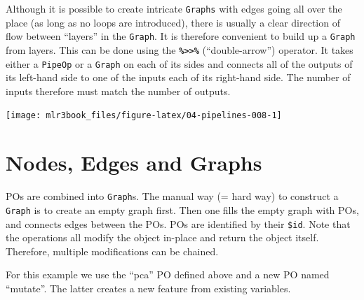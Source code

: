 \documentclass[
  11pt,
  parskip=half,
  DIV=calc,
  BCOR=10mm,
  x11names]{scrbook}
\newenvironment{Shaded}{}{}
\newcommand{\CommentTok}[1]{\textcolor[rgb]{0.00,0.50,0.00}{#1}}
\newcommand{\DataTypeTok}[1]{#1}
\newcommand{\KeywordTok}[1]{\textcolor[rgb]{0.00,0.00,1.00}{#1}}
\newcommand{\NormalTok}[1]{#1}
\newcommand{\OperatorTok}[1]{#1}
\newcommand{\OtherTok}[1]{\textcolor[rgb]{1.00,0.25,0.00}{#1}}
\newcommand{\StringTok}[1]{\textcolor[rgb]{0.00,0.50,0.50}{#1}}
\begin{document}
Although it is possible to create intricate \texttt{Graphs} with edges going all over the place (as long as no loops are introduced), there is usually a clear direction of flow between ``layers'' in the \texttt{Graph}.
It is therefore convenient to build up a \texttt{Graph} from layers.
This can be done using the \textbf{\texttt{\%\textgreater{}\textgreater{}\%}} (``double-arrow'') operator.
It takes either a \texttt{PipeOp} or a \texttt{Graph} on each of its sides and connects all of the outputs of its left-hand side to one of the inputs each of its right-hand side.
The number of inputs therefore must match the number of outputs.

\begin{Shaded}
\end{Shaded}

\begin{center}\texttt{[image: mlr3book\_files/figure-latex/04-pipelines-008-1]} \end{center}

\hypertarget{pipe-nodes-edges-graphs}{%
\section{Nodes, Edges and Graphs}\label{pipe-nodes-edges-graphs}}

POs are combined into \texttt{Graph}s.
The manual way (= hard way) to construct a \texttt{Graph} is to create an empty graph first.
Then one fills the empty graph with POs, and connects edges between the POs.
POs are identified by their \texttt{\$id}.
Note that the operations all modify the object in-place and return the object itself.
Therefore, multiple modifications can be chained.

For this example we use the ``pca'' PO defined above and a new PO named ``mutate''.
The latter creates a new feature from existing variables.
\end{document}
